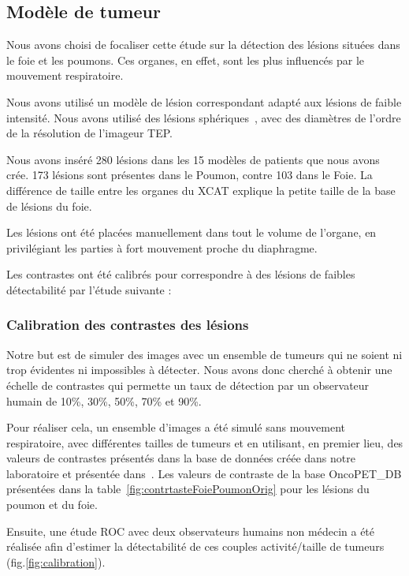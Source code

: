 \subsection{Modèle de tumeur}

Nous avons choisi de focaliser cette étude sur la détection des lésions situées dans le foie et les poumons. Ces organes, en effet, sont les plus influencés par le mouvement respiratoire.

Nous avons utilisé un modèle de lésion correspondant adapté aux lésions de faible intensité. Nous avons utilisé des lésions sphériques~\cite{bai2009regularized}, avec des diamètres de l'ordre de la résolution de l'imageur TEP.

Nous avons inséré 280 lésions dans les 15 modèles de patients que nous avons crée. 173 lésions sont présentes dans le Poumon, contre 103 dans le Foie. La différence de taille entre les organes du XCAT explique la petite taille de la base de lésions du foie. 

Les lésions ont été placées manuellement dans tout le volume de l'organe, en privilégiant les parties à fort mouvement proche du diaphragme. 

Les contrastes ont été calibrés pour correspondre à des lésions de faibles détectabilité par l'étude suivante :

\subsubsection{Calibration des contrastes des lésions}
\label{lab:etudeDetect}


Notre but est de simuler des images avec un ensemble de tumeurs qui ne soient ni trop évidentes ni impossibles à détecter. Nous avons donc cherché à obtenir une échelle de contrastes qui permette un taux de détection par un observateur humain de 10\%, 30\%, 50\%, 70\% et 90\%.

Pour réaliser cela, un ensemble d'images a été simulé sans mouvement respiratoire, avec différentes tailles de tumeurs et en utilisant, en premier lieu, des valeurs de contrastes présentés dans la base de données créée dans notre laboratoire et présentée dans~\cite{tomei2010oncopet_db}. Les valeurs de contraste de la base OncoPET\_DB présentées dans la table~\ref{fig:contrtasteFoiePoumonOrig} pour les lésions du poumon et du foie.


Ensuite, une étude ROC avec deux observateurs humains non médecin a été réalisée afin d'estimer la détectabilité de ces couples activité/taille de tumeurs (fig.\ref{fig:calibration}). 


